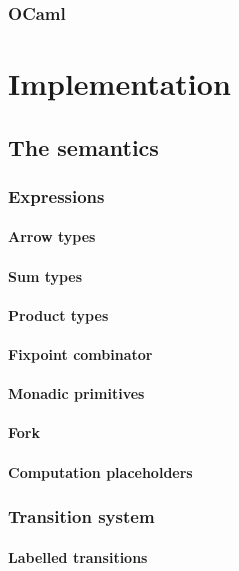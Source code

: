 \documentclass[12pt,twoside,notitlepage]{report}
\begin{document}

\subsection{OCaml}

\cleardoublepage
\chapter{Implementation}
\section{The semantics}
\subsection{Expressions}
\subsubsection{Arrow types}
\subsubsection{Sum types}
\subsubsection{Product types}
\subsubsection{Fixpoint combinator}
\subsubsection{Monadic primitives}
\subsubsection{Fork}
\subsubsection{Computation placeholders}
\subsection{Transition system}
\subsubsection{Labelled transitions}
\end{document}
